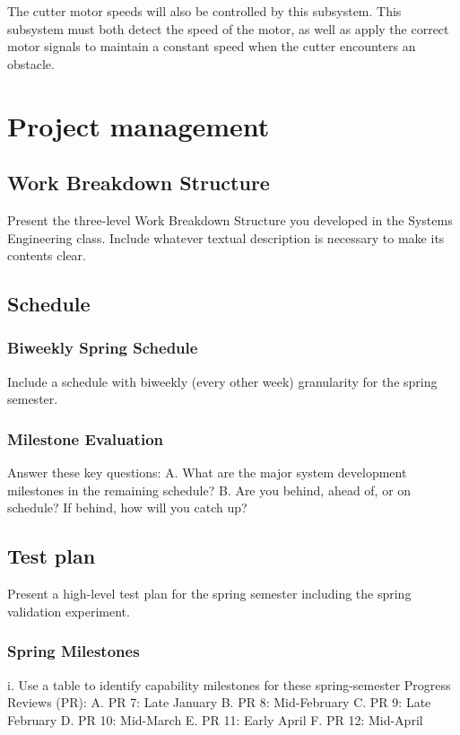 \documentclass[12pt]{extarticle}
\begin{document}
      The cutter motor speeds will also be controlled by this subsystem. This subsystem must both detect the speed of the motor, as well as apply the correct motor signals to maintain a constant speed when the cutter encounters an obstacle. 

\newpage

\section{Project management}
\subsection{Work Breakdown Structure}
Present the three-level Work Breakdown Structure you
developed in the Systems Engineering class. Include whatever textual description is
necessary to make its contents clear.
\subsection{Schedule}
\subsubsection{Biweekly Spring Schedule}
Include a schedule with biweekly (every other week) granularity for the spring
semester.
\subsubsection{Milestone Evaluation}
Answer these key questions:
A. What are the major system development milestones in the remaining
schedule?
B. Are you behind, ahead of, or on schedule? If behind, how will you catch up?

\subsection{Test plan}
Present a high-level test plan for the spring semester including the spring validation experiment.
\subsubsection{Spring Milestones}
i. Use a table to identify capability milestones for these spring-semester Progress
Reviews (PR):
A. PR 7: Late January
B. PR 8: Mid-February
C. PR 9: Late February
D. PR 10: Mid-March
E. PR 11: Early April
F. PR 12: Mid-April
\end{document}
